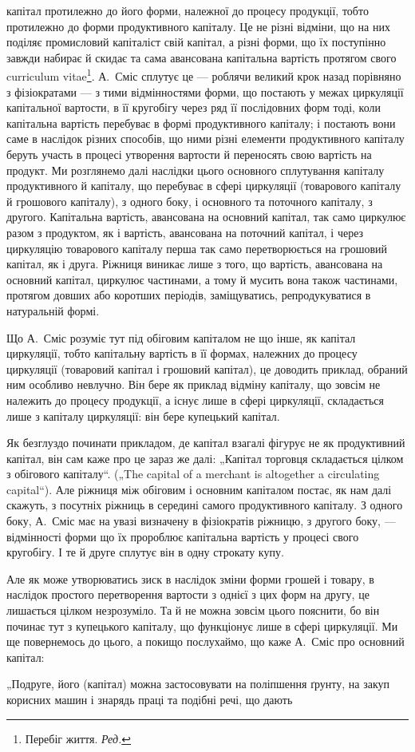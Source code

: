 \parcont{}  %
капітал протилежно до його форми, належної до процесу продукції,
тобто протилежно до форми продуктивного капіталу. Це не різні
відміни, що на них поділяє промисловий капіталіст свій капітал, а різні
форми, що їх поступінно завжди набирає й скидає та сама авансована
капітальна вартість протягом свого curriculum vitae\footnote*{
Перебіг життя. \emph{Ред.}
}. А.~Сміс сплутує це —
роблячи великий крок назад порівняно з фізіократами — з тими відмінностями
форми, що постають у межах циркуляції капітальної вартости, в її кругобігу
через ряд її послідовних форм тоді, коли капітальна вартість перебуває
в формі продуктивного капіталу; і постають вони саме в наслідок
різних способів, що ними різні елементи продуктивного капіталу беруть
участь в процесі утворення вартости й переносять свою вартість на продукт.
Ми розглянемо далі наслідки цього основного сплутування капіталу
продуктивного й капіталу, що перебуває в сфері циркуляції (товарового
капіталу й грошового капіталу), з одного боку, і основного та поточного
капіталу, з другого. Капітальна вартість, авансована на основний капітал,
так само циркулює разом з продуктом, як і вартість, авансована на поточний
капітал, і через циркуляцію товарового капіталу перша так само перетворюється
на грошовий капітал, як і друга. Ріжниця виникає лише з того,
що вартість, авансована на основний капітал, циркулює частинами, а тому
й мусить вона також частинами, протягом довших або коротших періодів,
заміщуватись, репродукуватися в натуральній формі.

Що А.~Сміс розуміє тут під обіговим капіталом не що інше, як капітал
циркуляції, тобто капітальну вартість в її формах, належних до процесу
циркуляції (товаровий капітал і грошовий капітал), це доводить приклад,
обраний ним особливо невлучно. Він бере як приклад відміну капіталу, що
зовсім не належить до процесу продукції, а існує лише в сфері циркуляції,
складається лише з капіталу циркуляції: він бере купецький капітал.

Як безглуздо починати прикладом, де капітал взагалі фігурує не як
продуктивний капітал, він сам каже про це зараз же далі: „Капітал торговця
складається цілком з обігового капіталу“. („The capital of a merchant
is altogether a circulating capital“). Але ріжниця між обіговим і основним
капіталом постає, як нам далі скажуть, з посутніх ріжниць в середині
самого продуктивного капіталу. З одного боку, А.~Сміс має на
увазі визначену в фізіократів ріжницю, з другого боку, — відмінності форми
що їх пророблює капітальна вартість у процесі свого кругобігу. І те
й друге сплутує він в одну строкату купу.

Але як може утворюватись зиск в наслідок зміни форми грошей і
товару, в наслідок простого перетворення вартости з однієї з цих форм
на другу, це лишається цілком незрозуміло. Та й не можна зовсім цього
пояснити, бо він починає тут з купецького капіталу, що функціонує
лише в сфері циркуляції. Ми ще повернемось до цього, а покищо послухаймо,
що каже А.~Сміс про основний капітал:

„Подруге, його (капітал) можна застосовувати на поліпшення ґрунту,
на закуп корисних машин і знарядь праці та подібні речі, що дають
\parbreak{}  %
